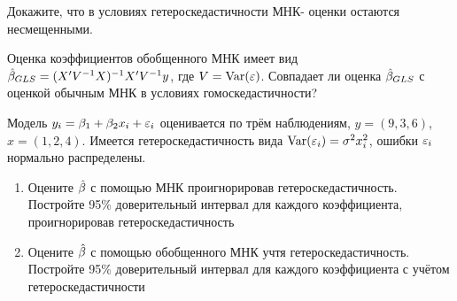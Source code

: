 \documentclass[pdftex,11pt,openany]{book}\usepackage[]{graphicx}\usepackage[]{color}
\begin{document}
\begin{problem}
Докажите, что в условиях гетероскедастичности МНК-
оценки остаются несмещенными.
\end{problem}

\begin{solution}
\end{solution}


\begin{problem}
Оценка коэффициентов обобщенного МНК имеет вид $\hat{\beta}_{GLS}=(X'V^{-1}X)^{-1}X'V^{-1}y$, где $V=\operatorname{Var}(\varepsilon)$. Совпадает ли оценка $\hat{\beta}_{GLS}$ с оценкой обычным МНК в условиях гомоскедастичности?
\end{problem}

\begin{solution}
\end{solution}


\begin{problem}
Модель $y_i=\beta_1 + \beta_2 x_i +\varepsilon_i$ оценивается по трём наблюдениям, $y=(9,3,6)$, $x=(1,2,4)$. Имеется гетероскедастичность вида $\operatorname{Var}(\varepsilon_i)=\sigma^2 x_i^2$, ошибки $\varepsilon_i$ нормально распределены. 
\begin{enumerate}
\item Оцените $\hat{\beta}$ с помощью МНК проигнорировав гетероскедастичность. Постройте 95\% доверительный интервал для каждого коэффициента, проигнорировав гетероскедастичность
\item Оцените $\hat{\beta}$ с помощью обобщенного МНК учтя гетероскедастичность. Постройте 95\% доверительный интервал для каждого коэффициента с учётом гетероскедастичности
\end{enumerate}
\end{problem}

\begin{solution}
\end{solution}
\end{document}

